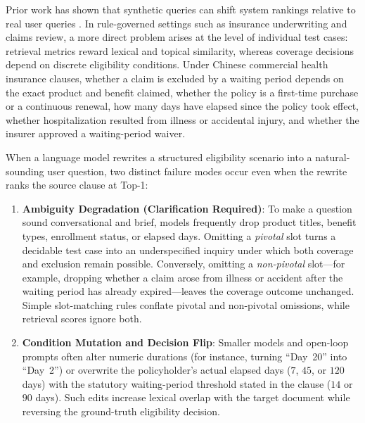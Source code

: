 \documentclass[10pt,twocolumn]{article}
\renewcommand{\_}{\textunderscore\allowbreak}
\begin{document}
Prior work has shown that synthetic queries can shift system rankings relative to real user queries \cite{rahmani2024syndl,vanelburg2025synthetic,kucia2026beyond}. In rule-governed settings such as insurance underwriting and claims review, a more direct problem arises at the level of individual test cases: retrieval metrics reward lexical and topical similarity, whereas coverage decisions depend on discrete eligibility conditions. Under Chinese commercial health insurance clauses, whether a claim is excluded by a waiting period depends on the exact product and benefit claimed, whether the policy is a first-time purchase or a continuous renewal, how many days have elapsed since the policy took effect, whether hospitalization resulted from illness or accidental injury, and whether the insurer approved a waiting-period waiver.

When a language model rewrites a structured eligibility scenario into a natural-sounding user question, two distinct failure modes occur even when the rewrite ranks the source clause at Top-1:
\begin{enumerate}[leftmargin=*,nosep]
  \item \textbf{Ambiguity Degradation (Clarification Required)}: To make a question sound conversational and brief, models frequently drop product titles, benefit types, enrollment status, or elapsed days. Omitting a \emph{pivotal} slot turns a decidable test case into an underspecified inquiry under which both coverage and exclusion remain possible. Conversely, omitting a \emph{non-pivotal} slot---for example, dropping whether a claim arose from illness or accident after the waiting period has already expired---leaves the coverage outcome unchanged. Simple slot-matching rules conflate pivotal and non-pivotal omissions, while retrieval scores ignore both.
  \item \textbf{Condition Mutation and Decision Flip}: Smaller models and open-loop prompts often alter numeric durations (for instance, turning ``Day~20'' into ``Day~2'') or overwrite the policyholder's actual elapsed days ($7$, $45$, or $120$ days) with the statutory waiting-period threshold stated in the clause ($14$ or $90$ days). Such edits increase lexical overlap with the target document while reversing the ground-truth eligibility decision.
\end{enumerate}
\end{document}
